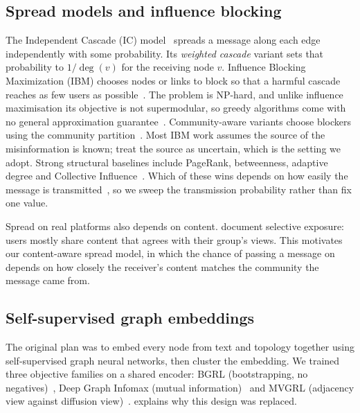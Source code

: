 \subsection{Spread models and influence blocking}
The Independent Cascade (IC) model~\citep{kempe2003maximizing} spreads a message along
each edge independently with some probability. Its \emph{weighted cascade} variant
sets that probability to $1/\deg(v)$ for the receiving node $v$. Influence Blocking
Maximization (IBM) chooses nodes or links to block so that a harmful cascade
reaches as few users as possible~\citep{budak2011limiting}. The problem is NP-hard, and
unlike influence maximisation its objective is not supermodular, so greedy algorithms
come with no general approximation guarantee~\citep{xie2025blocking}. Community-aware
variants choose blockers using the community partition~\citep{ghoshal2021community}.
Most IBM work assumes the source of the misinformation is known; \citet{chen2021uncertain}
treat the source as uncertain, which is the setting we adopt. Strong structural
baselines include PageRank, betweenness, adaptive degree and Collective
Influence~\citep{morone2015influence}. Which of these wins depends on how easily the
message is transmitted~\citep{hebert2013global}, so we sweep the transmission
probability rather than fix one value.

Spread on real platforms also depends on content. \citet{delvicario2016spreading}
document selective exposure: users mostly share content that agrees with their
group's views. This motivates our content-aware spread model, in which the chance of
passing a message on depends on how closely the receiver's content matches the
community the message came from.

\subsection{Self-supervised graph embeddings}
The original plan was to embed every node from text and topology together using
self-supervised graph neural networks, then cluster the embedding. We trained three
objective families on a shared encoder: BGRL (bootstrapping, no
negatives)~\citep{thakoor2022bgrl}, Deep Graph Infomax (mutual
information)~\citep{velickovic2019dgi} and MVGRL (adjacency view against diffusion
view)~\citep{hassani2020mvgrl}.  explains why this design
was replaced.

